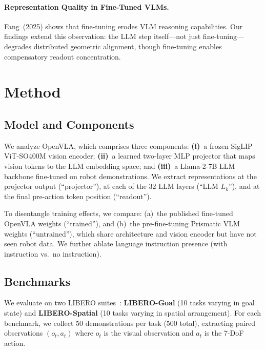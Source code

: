 \documentclass[letterpaper]{article}
\begin{document}
\paragraph{Representation Quality in Fine-Tuned VLMs.}
Fang~(2025) shows that fine-tuning erodes VLM reasoning capabilities.
Our findings extend this observation: the LLM step itself---not just fine-tuning---degrades distributed geometric alignment, though fine-tuning enables compensatory readout concentration.


\section{Method}
\label{sec:method}

\subsection{Model and Components}

We analyze OpenVLA, which comprises three components:
\textbf{(i)}~a frozen SigLIP ViT-SO400M vision encoder;
\textbf{(ii)}~a learned two-layer MLP projector that maps vision tokens to the LLM embedding space; and
\textbf{(iii)}~a Llama-2-7B LLM backbone fine-tuned on robot demonstrations.
We extract representations at the projector output (``projector''), at each of the 32 LLM layers (``LLM $L_k$''), and at the final pre-action token position (``readout'').

To disentangle training effects, we compare: (a)~the published fine-tuned OpenVLA weights (``trained''), and (b)~the pre-fine-tuning Prismatic VLM weights (``untrained''), which share architecture and vision encoder but have not seen robot data.
We further ablate language instruction presence (with instruction vs.\ no instruction).

\subsection{Benchmarks}

We evaluate on two LIBERO suites~\citep{liu2024libero}:
\textbf{LIBERO-Goal} (10 tasks varying in goal state) and \textbf{LIBERO-Spatial} (10 tasks varying in spatial arrangement).
For each benchmark, we collect 50 demonstrations per task (500 total), extracting paired observations $(o_t, a_t)$ where $o_t$ is the visual observation and $a_t$ is the 7-DoF action.
\end{document}

